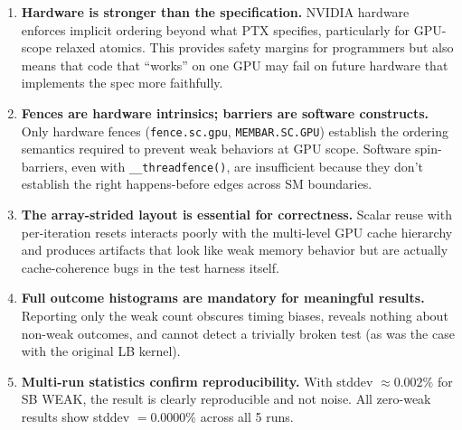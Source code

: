 \documentclass[a4paper]{article}
\begin{document}
\begin{enumerate}
  \item \textbf{Hardware is stronger than the specification.}
    NVIDIA hardware enforces implicit ordering beyond what PTX specifies, particularly for GPU-scope relaxed atomics. This provides safety margins for programmers but also means that code that ``works'' on one GPU may fail on future hardware that implements the spec more faithfully.

  \item \textbf{Fences are hardware intrinsics; barriers are software constructs.}
    Only hardware fences (\texttt{fence.sc.gpu}, \texttt{MEMBAR.SC.GPU}) establish the ordering semantics required to prevent weak behaviors at GPU scope. Software spin-barriers, even with \texttt{\_\_threadfence()}, are insufficient because they don't establish the right happens-before edges across SM boundaries.

  \item \textbf{The array-strided layout is essential for correctness.}
    Scalar reuse with per-iteration resets interacts poorly with the multi-level GPU cache hierarchy and produces artifacts that look like weak memory behavior but are actually cache-coherence bugs in the test harness itself.

  \item \textbf{Full outcome histograms are mandatory for meaningful results.}
    Reporting only the weak count obscures timing biases, reveals nothing about non-weak outcomes, and cannot detect a trivially broken test (as was the case with the original LB kernel).

  \item \textbf{Multi-run statistics confirm reproducibility.}
    With stddev $\approx 0.002\%$ for SB WEAK, the result is clearly reproducible and not noise. All zero-weak results show stddev $= 0.0000\%$ across all 5 runs.
\end{enumerate}



\end{document}
